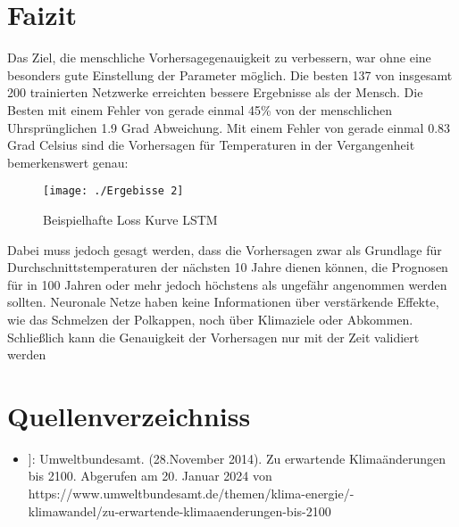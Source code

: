\documentclass[acmtog, authorversion]{acmart} %
\begin{document}
\section{Faizit}
Das Ziel, die menschliche Vorhersagegenauigkeit zu verbessern, war ohne eine besonders gute Einstellung der Parameter möglich. Die besten 137 von insgesamt 200 trainierten Netzwerke erreichten bessere Ergebnisse als der Mensch. Die Besten mit einem Fehler von gerade einmal 45\% von der menschlichen Uhrsprünglichen 1.9 Grad Abweichung.
Mit einem Fehler von gerade einmal 0.83 Grad Celsius sind die Vorhersagen für Temperaturen in der Vergangenheit bemerkenswert genau:
\begin{figure}[H]
    \centering
    \texttt{[image: ./Ergebisse 2]}
    \label{fig:sub7}
    \caption{Beispielhafte Loss Kurve LSTM}
\end{figure}
Dabei muss jedoch gesagt werden, dass die Vorhersagen zwar als Grundlage für Durchschnittstemperaturen der nächsten 10 Jahre dienen können, die Prognosen für in 100 Jahren oder mehr jedoch höchstens als ungefähr angenommen werden sollten. Neuronale Netze haben keine Informationen über verstärkende Effekte, wie das Schmelzen der Polkappen, noch über Klimaziele oder Abkommen. Schließlich kann die Genauigkeit der Vorhersagen nur mit der Zeit validiert werden

\section{Quellenverzeichniss}
\begin{itemize}
    \item {}]: Umweltbundesamt. (28.November 2014). Zu erwartende Klimaänderungen bis 2100. Abgerufen am 20. Januar 2024 von https://www.umweltbundesamt.de/themen/klima-energie/-\\
    klimawandel/zu-erwartende-klimaaenderungen-bis-2100
\end{itemize}
\end{document}
